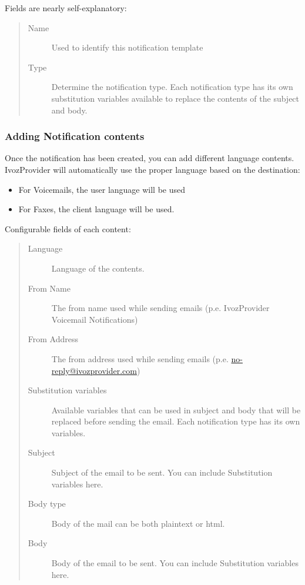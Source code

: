 \documentclass[letterpaper,10pt,spanish]{sphinxmanual}
\begin{document}
Fields are nearly self-explanatory:
\begin{quote}
\begin{description}
\item[{Name}] \leavevmode
Used to identify this notification template

\item[{Type}] \leavevmode
Determine the notification type. Each notification type has its own substitution variables available to replace
the contents of the subject and body.

\end{description}
\end{quote}


\subsubsection{Adding Notification contents}
\label{administration_portal/brand/settings/notification_templates:adding-notification-contents}
Once the notification has been created, you can add different language contents. IvozProvider will automatically use
the proper language based on the destination:
\begin{itemize}
\item {} 
For Voicemails, the user language will be used

\item {} 
For Faxes, the client language will be used.

\end{itemize}

Configurable fields of each content:
\begin{quote}
\begin{description}
\item[{Language}] \leavevmode
Language of the contents.

\item[{From Name}] \leavevmode
The from name used while sending emails (p.e. IvozProvider Voicemail Notifications)

\item[{From Address}] \leavevmode
The from address used while sending emails (p.e. \href{mailto:no-reply@ivozprovider.com}{no-reply@ivozprovider.com})

\item[{Substitution variables}] \leavevmode
Available variables that can be used in subject and body that will be replaced before sending the email. Each
notification type has its own variables.

\item[{Subject}] \leavevmode
Subject of the email to be sent. You can include Substitution variables here.

\item[{Body type}] \leavevmode
Body of the mail can be both plaintext or html.

\item[{Body}] \leavevmode
Body of the email to be sent. You can include Substitution variables here.

\end{description}
\end{quote}
\end{document}
